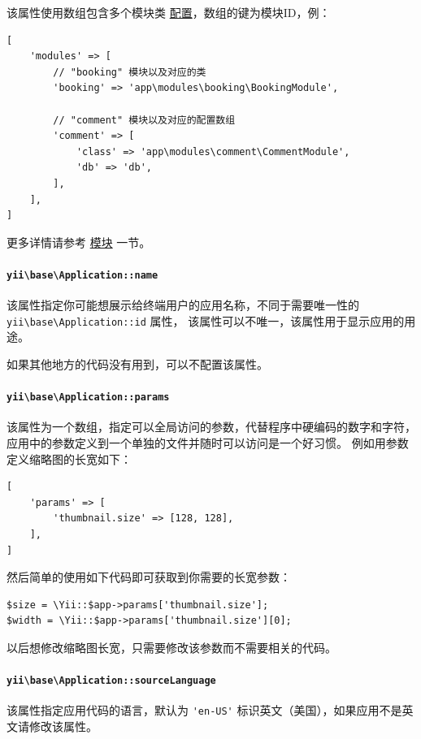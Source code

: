 该属性使用数组包含多个模块类 \hyperref[concept-configurations.md]{配置}，数组的键为模块ID，例：

\lstset{language=php}\begin{lstlisting}
[
    'modules' => [
        // "booking" 模块以及对应的类
        'booking' => 'app\modules\booking\BookingModule',

        // "comment" 模块以及对应的配置数组
        'comment' => [
            'class' => 'app\modules\comment\CommentModule',
            'db' => 'db',
        ],
    ],
]
\end{lstlisting}
更多详情请参考 \hyperref[structure-modules.md]{模块} 一节。

\paragraph{\texttt{yii{\allowbreak{}\textbackslash}base{\allowbreak{}\textbackslash}Application\allowbreak{}::\allowbreak{}name} \label{structure-applications.md::name}}
该属性指定你可能想展示给终端用户的应用名称，不同于需要唯一性的 \texttt{yii{\allowbreak{}\textbackslash}base{\allowbreak{}\textbackslash}Application\allowbreak{}::\allowbreak{}id} 属性，
该属性可以不唯一，该属性用于显示应用的用途。

如果其他地方的代码没有用到，可以不配置该属性。

\paragraph{\texttt{yii{\allowbreak{}\textbackslash}base{\allowbreak{}\textbackslash}Application\allowbreak{}::\allowbreak{}params} \label{structure-applications.md::params}}
该属性为一个数组，指定可以全局访问的参数，代替程序中硬编码的数字和字符，应用中的参数定义到一个单独的文件并随时可以访问是一个好习惯。
例如用参数定义缩略图的长宽如下：

\lstset{language=php}\begin{lstlisting}
[
    'params' => [
        'thumbnail.size' => [128, 128],
    ],
]
\end{lstlisting}
然后简单的使用如下代码即可获取到你需要的长宽参数：

\lstset{language=php}\begin{lstlisting}
$size = \Yii::$app->params['thumbnail.size'];
$width = \Yii::$app->params['thumbnail.size'][0];
\end{lstlisting}
以后想修改缩略图长宽，只需要修改该参数而不需要相关的代码。

\paragraph{\texttt{yii{\allowbreak{}\textbackslash}base{\allowbreak{}\textbackslash}Application\allowbreak{}::\allowbreak{}sourceLanguage} \label{structure-applications.md::sourceLanguage}}
该属性指定应用代码的语言，默认为 \lstinline|'en-US'| 标识英文（美国），如果应用不是英文请修改该属性。

